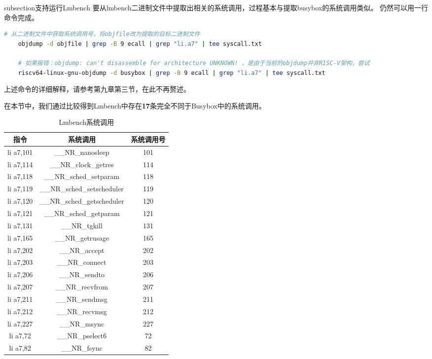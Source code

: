 subsection{支持运行Lmbench}
要从lmbench二进制文件中提取出相关的系统调用，过程基本与提取busybox的系统调用类似。
仍然可以用一行命令完成。

\begin{lstlisting}[language=bash]
    # 从二进制文件中获取系统调用号，将objfile改为提取的目标二进制文件
    objdump -d objfile | grep -B 9 ecall | grep "li.a7" | tee syscall.txt

    # 如果报错：objdump: can't disassemble for architecture UNKNOWN! ，是由于当前的objdump并非RISC-V架构，尝试
    riscv64-linux-gnu-objdump -d busybox | grep -B 9 ecall | grep "li.a7" | tee syscall.txt

\end{lstlisting}

上述命令的详细解释，请参考第九章第三节，在此不再赘述。

在本节中，我们通过比较得到Lmbench中存在\textbf{17}条完全不同于Busybox中的系统调用。

\begin{table}[h]
\centering
\begin{tabular}{|c|c|c|}
\hline
\textbf{指令} & \textbf{系统调用} & \textbf{系统调用号} \\
\hline
li a7,101 & \_\_NR\_nanosleep & 101 \\
\hline
li a7,114 & \_\_NR\_clock\_getres & 114 \\
\hline
li a7,118 & \_\_NR\_sched\_setparam & 118 \\
\hline
li a7,119 & \_\_NR\_sched\_setscheduler & 119 \\
\hline
li a7,120 & \_\_NR\_sched\_getscheduler & 120 \\
\hline
li a7,121 & \_\_NR\_sched\_getparam & 121 \\
\hline
li a7,131 & \_\_NR\_tgkill & 131 \\
\hline
li a7,165 & \_\_NR\_getrusage & 165 \\
\hline
li a7,202 & \_\_NR\_accept & 202 \\
\hline
li a7,203 & \_\_NR\_connect & 203 \\
\hline
li a7,206 & \_\_NR\_sendto & 206 \\
\hline
li a7,207 & \_\_NR\_recvfrom & 207 \\
\hline
li a7,211 & \_\_NR\_sendmsg & 211 \\
\hline
li a7,212 & \_\_NR\_recvmsg & 212 \\
\hline
li a7,227 & \_\_NR\_msync & 227 \\
\hline
li a7,72 & \_\_NR\_pselect6 & 72 \\
\hline
li a7,82 & \_\_NR\_fsync & 82 \\
\hline
\end{tabular}
\caption{Lmbench系统调用}
\label{table:syscalls_compact}
\end{table}

